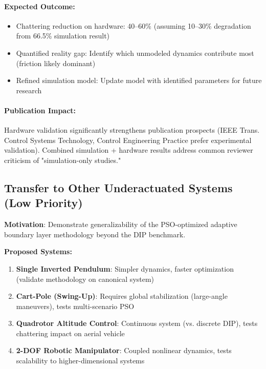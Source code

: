\paragraph{Expected Outcome:}
\begin{itemize}
    \item Chattering reduction on hardware: 40--60\% (assuming 10--30\% degradation from 66.5\% simulation result)
    \item Quantified reality gap: Identify which unmodeled dynamics contribute most (friction likely dominant)
    \item Refined simulation model: Update model with identified parameters for future research
\end{itemize}

\paragraph{Publication Impact:}
Hardware validation significantly strengthens publication prospects (IEEE Trans. Control Systems Technology, Control Engineering Practice prefer experimental validation). Combined simulation + hardware results address common reviewer criticism of "simulation-only studies."

\subsection{Transfer to Other Underactuated Systems (Low Priority)}
\label{sec:conclusions_transfer}

\textbf{Motivation}: Demonstrate generalizability of the PSO-optimized adaptive boundary layer methodology beyond the DIP benchmark.

\textbf{Proposed Systems:}
\begin{enumerate}
    \item \textbf{Single Inverted Pendulum}: Simpler dynamics, faster optimization (validate methodology on canonical system)
    \item \textbf{Cart-Pole (Swing-Up)}: Requires global stabilization (large-angle maneuvers), tests multi-scenario PSO
    \item \textbf{Quadrotor Altitude Control}: Continuous system (vs. discrete DIP), tests chattering impact on aerial vehicle
    \item \textbf{2-DOF Robotic Manipulator}: Coupled nonlinear dynamics, tests scalability to higher-dimensional systems
\end{enumerate}


